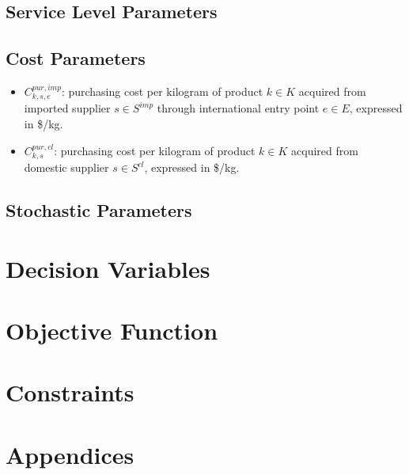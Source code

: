 \documentclass[12pt]{article}
\begin{document}
\subsection{Service Level Parameters}

\subsection{Cost Parameters}
\begin{itemize}
    \item $C^{pur,imp}_{k,s,e}$: purchasing cost per kilogram of product $k \in K$ acquired from imported supplier $s \in S^{imp}$ through international entry point $e \in E$, expressed in \$/kg.

    \item $C^{pur,cl}_{k,s}$: purchasing cost per kilogram of product $k \in K$ acquired from domestic supplier $s \in S^{cl}$, expressed in \$/kg.
\end{itemize}

\subsection{Stochastic Parameters}

\newpage

\section{Decision Variables}
\newpage

\section{Objective Function}
\newpage

\section{Constraints}
\newpage

\section{Appendices}
\end{document}
